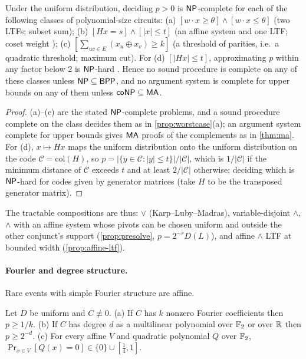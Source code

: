 \begin{proposition}\label{prop:nonclosure}
Under the uniform distribution, deciding $p>0$ is $\mathsf{NP}$-complete for each of the
following classes of polynomial-size circuits: (a) $[w\cdot x\ge\theta]\wedge[w\cdot
x\le\theta]$ (two LTFs; subset sum); (b) $[Hx=s]\wedge[|x|\le t]$ (an affine system and
one LTF; coset weight \cite{bmvt1978}); (c) $[\sum_{uv\in E}(x_u\oplus x_v)\ge k]$ (a
threshold of parities, i.e.\ a quadratic threshold; maximum cut). For (d)
$[|Hx|\le t]$, approximating $p$ within any factor below $2$ is $\mathsf{NP}$-hard
\cite{vardy1997}. Hence no sound procedure is complete on any of these classes unless
$\mathsf{NP}\subseteq\mathsf{BPP}$, and no argument system is complete for upper bounds on any of them
unless $\mathsf{coNP}\subseteq\mathsf{MA}$.
\end{proposition}

\begin{proof}
(a)--(c) are the stated $\mathsf{NP}$-complete problems, and a sound procedure complete on the
class decides them as in \cref{prop:worstcase}(a); an argument system complete for upper
bounds gives $\mathsf{MA}$ proofs of the complements as in \cref{thm:ma}. For (d), $x\mapsto
Hx$ maps the uniform distribution onto the uniform distribution on the code
$\mathcal C=\mathrm{col}(H)$, so $p=|\{y\in\mathcal C:|y|\le t\}|/|\mathcal C|$, which
is $1/|\mathcal C|$ if the minimum distance of $\mathcal C$ exceeds $t$ and at least
$2/|\mathcal C|$ otherwise; deciding which is $\mathsf{NP}$-hard for codes given by generator
matrices \cite{vardy1997} (take $H$ to be the transposed generator matrix).
\end{proof}

The tractable compositions are thus: $\vee$ (Karp--Luby--Madras), variable-disjoint
$\wedge$, $\wedge$ with an affine system whose pivots can be chosen uniform and outside
the other conjunct's support (\cref{prop:presolve}, $p=2^{-r}D(L)$), and affine
$\wedge$ LTF at bounded width (\cref{prop:affine-ltf}).

\paragraph{Fourier and degree structure.}
Rare events with simple Fourier structure are affine.

\begin{proposition}\label{prop:fourier}
Let $D$ be uniform and $C\not\equiv0$.
(a) If $C$ has $k$ nonzero Fourier coefficients then $p\ge1/k$.
(b) If $C$ has degree $d$ as a multilinear polynomial over $\mathbb{F}_2$ or over $\mathbb{R}$ then
$p\ge2^{-d}$.
(c) For every affine $V$ and quadratic polynomial $Q$ over $\mathbb{F}_2$,
$\Pr_{x\in V}[Q(x)=0]\in\{0\}\cup[\frac14,1]$.
\end{proposition}

